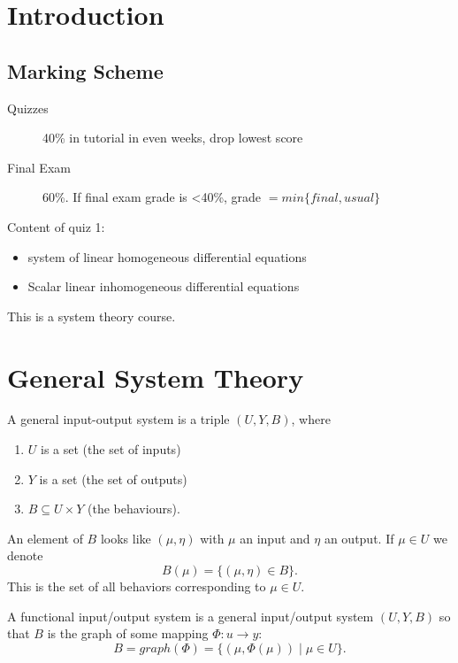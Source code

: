 	
	\section{Introduction}
	\subsection{Marking Scheme}
	\begin{description}
		\item[Quizzes] 40\% in tutorial in even weeks, drop lowest score
		\item[Final Exam] 60\%. If final exam grade is <40\%, grade $=min\{final, usual\}$
	\end{description}
	
	Content of quiz 1:

	\begin{itemize}
		\item system of linear homogeneous differential equations 
		\item Scalar linear inhomogeneous differential equations 
	\end{itemize}
	
	This is a system theory course. 

	\section{General System Theory}
	
	\begin{definition}
		A general input-output system is a triple $(U, Y, B)$, where

	\begin{enumerate}
		\item $U$ is a set (the set of inputs)
		\item $Y$ is a set (the set of outputs)
		\item $B \subseteq U \times  Y$ (the behaviours).
	\end{enumerate}
	\end{definition} 
	An element of $B$ looks like $(\mu , \eta)$ with $\mu$ an input and $\eta$ an output. If $\mu \in U$ we denote 
	\[
		B(\mu) = \{(\mu, \eta) \in B\}
	.\]
	This is the set of all behaviors corresponding to $\mu \in U$. 

	\begin{definition}
		A functional input/output system is a general input/output system $(U, Y, B)$ so that $B$ is the graph of some mapping $ \Phi : u \to y $:
	\[
		B = graph(\Phi) = \{(\mu, \Phi (\mu))  \mid \mu \in  U\}
	.\] 
	\end{definition}

